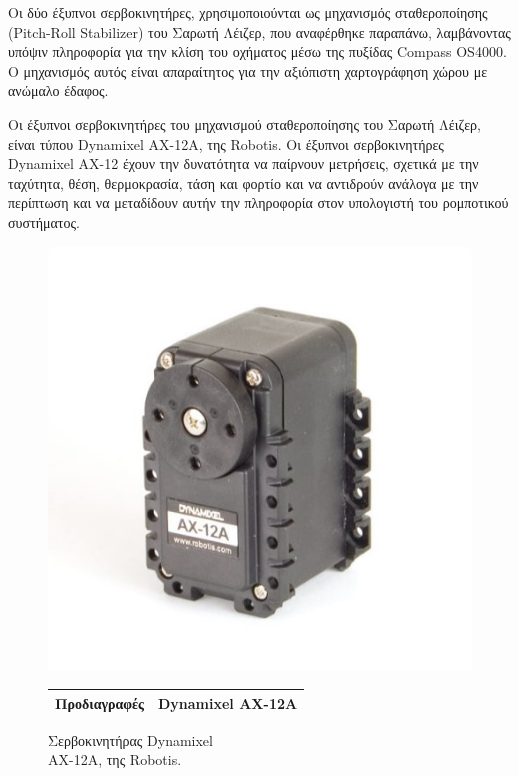 \bigskip
Οι δύο {έξυπνοι σερβοκινητήρες}, χρησιμοποιούνται ως {μηχανισμός σταθεροποίησης (Pitch-Roll Stabilizer)} του {Σαρωτή Λέιζερ}, που αναφέρθηκε παραπάνω, λαμβάνοντας υπόψιν πληροφορία για την κλίση του οχήματος μέσω της πυξίδας {Compass OS4000}. Ο μηχανισμός αυτός είναι απαραίτητος για την αξιόπιστη χαρτογράφηση χώρου με ανώμαλο έδαφος.

\bigskip
Οι {έξυπνοι σερβοκινητήρες} του {μηχανισμού σταθεροποίησης} του {Σαρωτή Λέιζερ}, είναι τύπου {Dynamixel AX-12A}, της {Robotis}. Οι {έξυπνοι σερβοκινητήρες Dynamixel AX-12} έχουν την δυνατότητα να παίρνουν μετρήσεις, σχετικά με την ταχύτητα, θέση, θερμοκρασία, τάση και φορτίο και να αντιδρούν ανάλογα με την περίπτωση και να μεταδίδουν αυτήν την πληροφορία στον υπολογιστή του ρομποτικού συστήματος.

\begin{figure}[!ht]
	\begin{minipage}[b]{0.45\textwidth}
		\centering
		\includegraphics[width=0.8\linewidth]{Chapters/Chapter2/Figures/dxl_ax_12a.jpg}
		\caption{Σερβοκινητήρας Dynamixel\\ AX-12A, της Robotis.}
		\label{fig:dxl_ax_12a}
	\end{minipage}		
	\begin{minipage}[b]{0.475\textwidth}
		\centering
		\begin{tabular}{| l | c |}
			\hline
			\textbf{Προδιαγραφές} & \textbf{Dynamixel AX-12A}\\ \hline

\end{tabular}
\end{minipage}
\end{figure}
